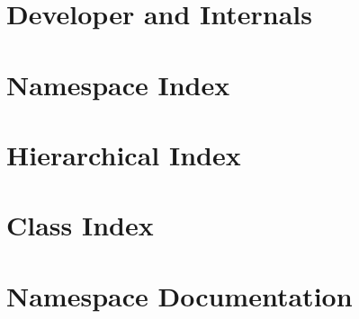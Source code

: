 \documentclass[twoside]{book}
\newcommand{\+}{\discretionary{\mbox{\scriptsize$\hookleftarrow$}}{}{}}
\begin{document}
\chapter{Developer and Internals}
\label{dev-welcome}

\chapter{Namespace Index}

\chapter{Hierarchical Index}

\chapter{Class Index}

\chapter{Namespace Documentation}





\end{document}
